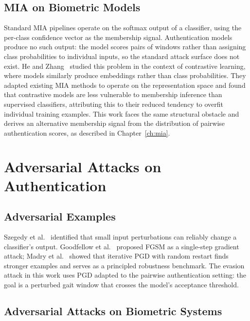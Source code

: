 \subsection{MIA on Biometric Models}
\label{ssec:rel_mia_biometric_detail}

Standard MIA pipelines operate on the softmax output of a classifier, using the per-class confidence vector as the membership signal. Authentication models produce no such output: the model scores pairs of windows rather than assigning class probabilities to individual inputs, so the standard attack surface does not exist. He and Zhang~\cite{he2021quantifying} studied this problem in the context of contrastive learning, where models similarly produce embeddings rather than class probabilities. They adapted existing MIA methods to operate on the representation space and found that contrastive models are less vulnerable to membership inference than supervised classifiers, attributing this to their reduced tendency to overfit individual training examples. This work faces the same structural obstacle and derives an alternative membership signal from the distribution of pairwise authentication scores, as described in Chapter~\ref{ch:mia}.

\section{Adversarial Attacks on Authentication}
\label{sec:rel_evasion}

\subsection{Adversarial Examples}
\label{ssec:rel_evasion_foundations}

Szegedy et al.~\cite{szegedy2014intriguing} identified that small input perturbations can reliably change a classifier's output. Goodfellow et al.~\cite{goodfellow2015explaining} proposed FGSM as a single-step gradient attack; Madry et al.~\cite{madry2018towards} showed that iterative PGD with random restart finds stronger examples and serves as a principled robustness benchmark. The evasion attack in this work uses PGD adapted to the pairwise authentication setting: the goal is a perturbed gait window that crosses the model's acceptance threshold.

\subsection{Adversarial Attacks on Biometric Systems}
\label{ssec:rel_evasion_biometric}

